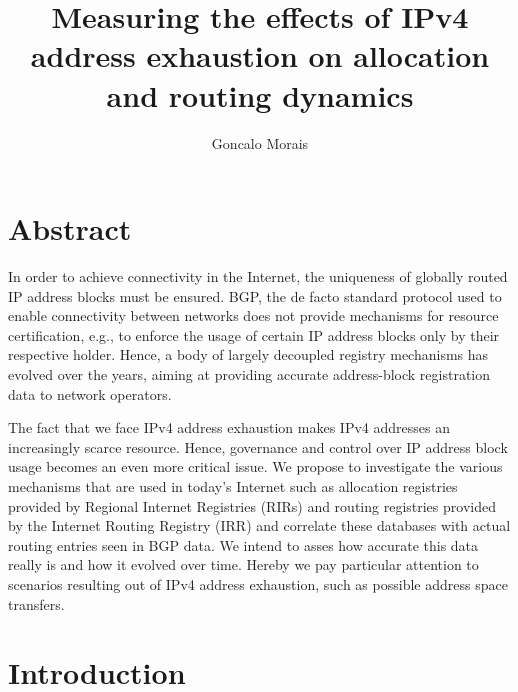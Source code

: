 \documentclass[11pt,a4paper]{scrreprt}
\title{\textbf{Measuring the effects of IPv4 address exhaustion on allocation and routing dynamics}}
\author{Goncalo Morais}
\date{}
\begin{document}
\maketitle

\tableofcontents
\listoffigures
\listoftables

\setcounter{chapter}{0}


\chapter*{Abstract}
In order to achieve connectivity in the Internet, the uniqueness of
globally routed IP address blocks must be ensured. BGP, the de facto
standard protocol used to enable connectivity between networks does not
provide mechanisms for resource certification, e.g., to enforce the
usage of certain IP address blocks only by their respective holder.
Hence, a body of largely decoupled registry mechanisms has evolved over
the years, aiming at providing accurate address-block registration data
to network operators.

The fact that we face IPv4 address exhaustion makes IPv4 addresses an
increasingly scarce resource. Hence, governance and control over IP
address block usage becomes an even more critical issue. We propose to
investigate the various mechanisms that are used in today's Internet
such as allocation registries provided by Regional Internet Registries
(RIRs) and routing registries provided by the Internet Routing Registry
(IRR) and correlate these databases with actual routing entries seen in
BGP data. We intend to asses how accurate this data really is and how it
evolved over time. Hereby we pay particular attention to scenarios
resulting out of IPv4 address exhaustion, such as possible address space
transfers.


\chapter{Introduction}
\end{document}
